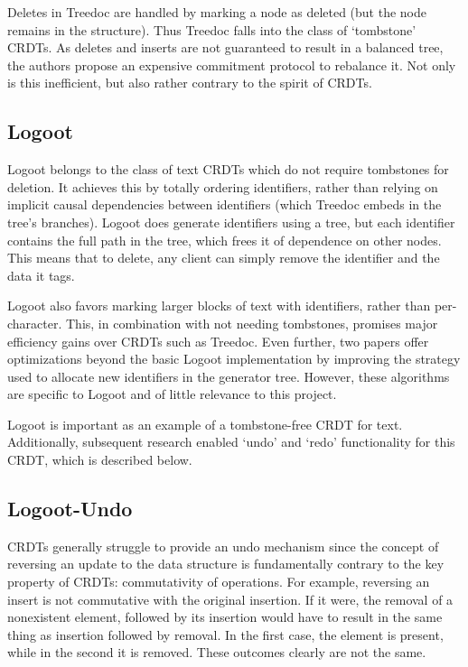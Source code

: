 \documentclass[12pt,a4paper,twoside,openright]{report}
\begin{document}
Deletes in Treedoc are handled by marking a node as deleted (but the node remains in the structure). Thus Treedoc falls into the class of `tombstone' CRDTs. As deletes and inserts are not guaranteed to result in a balanced tree, the authors propose an expensive commitment protocol to rebalance it. Not only is this inefficient, but also rather contrary to the spirit of CRDTs.

\subsection{Logoot}

Logoot \cite{weiss2008} belongs to the class of text CRDTs which do not require tombstones for deletion. It achieves this by totally ordering identifiers, rather than relying on implicit causal dependencies between identifiers (which Treedoc embeds in the tree's branches). Logoot does generate identifiers using a tree, but each identifier contains the full path in the tree, which frees it of dependence on other nodes. This means that to delete, any client can simply remove the identifier and the data it tags.

Logoot also favors marking larger blocks of text with identifiers, rather than per-character. This, in combination with not needing tombstones, promises major efficiency gains over CRDTs such as Treedoc. Even further, two papers \cite{nedelec2013lseq} \cite{nedelec2013} offer optimizations beyond the basic Logoot implementation by improving the strategy used to allocate new identifiers in the generator tree. However, these algorithms are specific to Logoot and of little relevance to this project.

Logoot is important as an example of a tombstone-free CRDT for text. Additionally, subsequent research enabled `undo' and `redo' functionality for this CRDT, which is described below.


\subsection{Logoot-Undo}

CRDTs generally struggle to provide an undo mechanism since the concept of reversing an update to the data structure is fundamentally contrary to the key property of CRDTs: commutativity of operations. For example, reversing an insert is not commutative with the original insertion. If it were, the removal of a nonexistent element, followed by its insertion would have to result in the same thing as insertion followed by removal. In the first case, the element is present, while in the second it is removed. These outcomes clearly are not the same.
\end{document}
